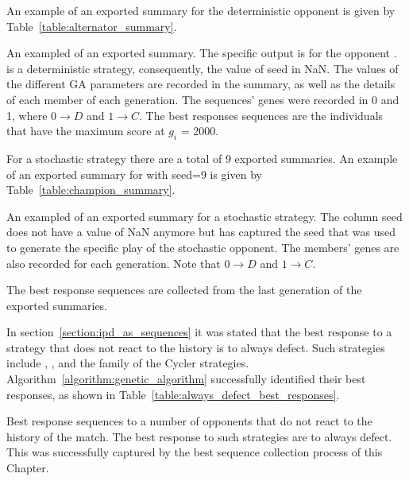 An example of an exported summary for the deterministic opponent \Alternator
is given by Table~\ref{table:alternator_summary}.

\begin{table}[!htbp]
    \resizebox{\textwidth}{!}{
    }
    \caption{An exampled of an exported summary. The specific output is for
    the opponent \Alternator. \Alternator is a deterministic strategy,
    consequently, the value of seed in NaN. The values of the different GA
    parameters are recorded in the summary, as well as the details of each
    member of each generation. The sequences' genes
    were recorded in 0 and 1, where \(0 \to D\) and \(1 \to C\).
    The best responses sequences are the individuals
    that have the maximum score at \(g_i\) = 2000.}\label{table:alternator_summary}
\end{table}

For a stochastic strategy there are a total of 9 exported summaries. An example
of an exported summary for \Champion with seed=9 is given by
Table~\ref{table:champion_summary}.

\begin{table}[!htbp]
    \resizebox{\textwidth}{!}{
    }
    \caption{An exampled of an exported summary for a stochastic strategy. The
    column seed does not have a value of NaN anymore but has captured the seed that
    was used to generate the specific play of the stochastic opponent. The members'
    genes are also recorded for each generation. Note that \(0 \to D\) and
    \(1 \to C\).}\label{table:champion_summary}
\end{table}

The best response sequences are collected from the last generation of the
exported summaries. 

In section~\ref{section:ipd_as_sequences} it was stated that the best response
to a strategy that does not react to the history is to always defect. Such
strategies include \Cooperator, \Defector, \Alternator and the family of the Cycler
strategies. Algorithm~\ref{algorithm:genetic_algorithm} successfully identified their best responses, as
shown in Table~\ref{table:always_defect_best_responses}.

\begin{table}[!htbp]
    \resizebox{\textwidth}{!}{
    }
    \caption{Best response sequences to a number of opponents that do not react
    to the history of the match. The best response to such strategies are to always
    defect. This was successfully captured by the best sequence collection process
    of this Chapter.}\label{table:always_defect_best_responses}
\end{table}

